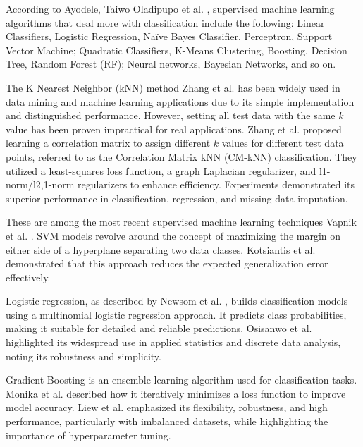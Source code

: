 \documentclass[pdflatex,sn-nature,Numbered]{sn-jnl}%
\theoremstyle{thmstyleone}%
\theoremstyle{thmstyletwo}%
\theoremstyle{thmstylethree}%
\begin{document}
\hspace*{1em} According to Ayodele, Taiwo Oladipupo et al. \cite{ref3}, supervised machine learning algorithms that deal more with classification include the following: Linear Classifiers, Logistic Regression, Naïve Bayes Classifier, Perceptron, Support Vector Machine; Quadratic Classifiers, K-Means Clustering, Boosting, Decision Tree, Random Forest (RF); Neural networks, Bayesian Networks, and so on.

\hspace*{1em} The K Nearest Neighbor (kNN) method Zhang et al. \cite{knn} has been widely used in data mining and machine learning applications due to its simple implementation and distinguished performance. However, setting all test data with the same \(k\) value has been proven impractical for real applications. Zhang et al. \cite{knn2} proposed learning a correlation matrix to assign different \(k\) values for different test data points, referred to as the Correlation Matrix kNN (CM-kNN) classification. They utilized a least-squares loss function, a graph Laplacian regularizer, and l1-norm/l2,1-norm regularizers to enhance efficiency. Experiments demonstrated its superior performance in classification, regression, and missing data imputation.

\hspace*{1em} These are among the most recent supervised machine learning techniques Vapnik et al. \cite{svm1}. SVM models revolve around the concept of maximizing the margin on either side of a hyperplane separating two data classes. Kotsiantis et al. \cite{ref2} demonstrated that this approach reduces the expected generalization error effectively.

\hspace*{1em} Logistic regression, as described by Newsom et al. \cite{logistic1}, builds classification models using a multinomial logistic regression approach. It predicts class probabilities, making it suitable for detailed and reliable predictions. Osisanwo et al. \cite{logistic2} highlighted its widespread use in applied statistics and discrete data analysis, noting its robustness and simplicity.

\hspace*{1em} Gradient Boosting is an ensemble learning algorithm used for classification tasks. Monika et al. \cite{xg1} described how it iteratively minimizes a loss function to improve model accuracy. Liew et al. \cite{xg2} emphasized its flexibility, robustness, and high performance, particularly with imbalanced datasets, while highlighting the importance of hyperparameter tuning.
\end{document}
